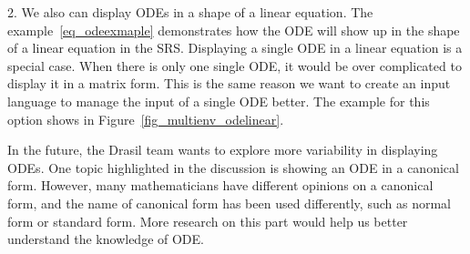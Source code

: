 2. We also can display ODEs in a shape of a linear equation. The example~\ref{eq_odeexmaple} demonstrates how the ODE will show up in the shape of a linear equation in the SRS. Displaying a single ODE in a linear equation is a special case. When there is only one single ODE, it would be over complicated to display it in a matrix form. This is the same reason we want to create an input language to manage the input of a single ODE better. The example for this option shows in Figure~\ref{fig_multienv_odelinear}.

In the future, the Drasil team wants to explore more variability in displaying ODEs. One topic highlighted in the discussion is showing an ODE in a canonical form. However, many mathematicians have different opinions on a canonical form, and the name of canonical form has been used differently, such as normal form or standard form. More research on this part would help us better understand the knowledge of ODE.
